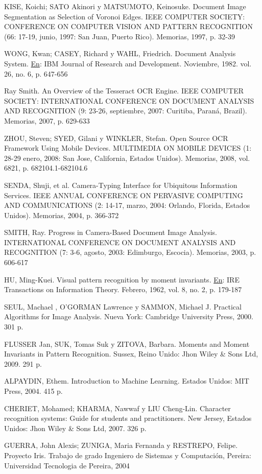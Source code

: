 \documentclass[a4paper, 12pt, oneside]{article}
\begin{document}
	KISE, Koichi; SATO Akinori y MATSUMOTO, Keinosuke. Document Image Segmentation as Selection of Voronoi Edges. IEEE COMPUTER SOCIETY: CONFERENCE ON COMPUTER VISION AND PATTERN RECOGNITION (66: 17-19, junio, 1997: San Juan, Puerto Rico). Memorias, 1997, p. 32-39
	
	WONG, Kwan; CASEY, Richard y WAHL, Friedrich. Document Analysis System. \underline{En}: IBM Journal of Research and Development. Noviembre, 1982. vol. 26, no. 6, p. 647-656
	
	Ray Smith. An Overview of the Tesseract OCR Engine. IEEE COMPUTER SOCIETY: INTERNATIONAL CONFERENCE ON DOCUMENT ANALYSIS AND RECOGNITION (9: 23-26, septiembre, 2007: Curitiba, Paraná, Brazil). Memorias, 2007, p. 629-633
	
	ZHOU, Steven; SYED, Gilani y WINKLER, Stefan. Open Source OCR Framework Using Mobile Devices. MULTIMEDIA ON MOBILE DEVICES (1: 28-29 enero, 2008: San Jose, California, Estados Unidos). Memorias, 2008, vol. 6821, p. 682104.1-682104.6
	
	SENDA, Shuji, et al. Camera-Typing Interface for Ubiquitous Information Services. IEEE ANNUAL CONFERENCE ON PERVASIVE COMPUTING AND COMMUNICATIONS (2: 14-17, marzo, 2004: Orlando, Florida, Estados Unidos). Memorias, 2004, p. 366-372
	
	SMITH, Ray. Progress in Camera-Based Document Image Analysis. INTERNATIONAL CONFERENCE ON DOCUMENT ANALYSIS AND RECOGNITION (7: 3-6, agosto, 2003: Edimburgo, Escocia). Memorias, 2003, p. 606-617
	
	HU, Ming-Kuei. Visual pattern recognition by moment invariants. \underline{En}: IRE Transactions on Information Theory. Febrero, 1962, vol. 8, no. 2, p. 179-187
	
	SEUL, Machael , O'GORMAN Lawrence y SAMMON, Michael J. Practical Algorithms for Image Analysis. Nueva York: Cambridge University Press, 2000. 301 p.
	
	FLUSSER Jan, SUK, Tomas Suk y ZITOVA, Barbara. Moments and Moment Invariants in Pattern Recognition. Sussex, Reino Unido: Jhon Wiley \& Sons Ltd, 2009. 291 p.
	
	ALPAYDIN, Ethem. Introduction to Machine Learning. Estados Unidos: MIT Press, 2004. 415 p.
	
	CHERIET, Mohamed; KHARMA, Nawwaf y LIU Cheng-Lin. Character recognition systems: Guide for students and practitioners. New Jersey, Estados Unidos: Jhon Wiley \& Sons Ltd, 2007. 326 p.
	
	GUERRA, John Alexis; ZUNIGA, Maria Fernanda y RESTREPO, Felipe. Proyecto Iris. Trabajo de grado Ingeniero de Sistemas y Computación, Pereira: Universidad Tecnologia de Pereira, 2004
	
\end{document}
